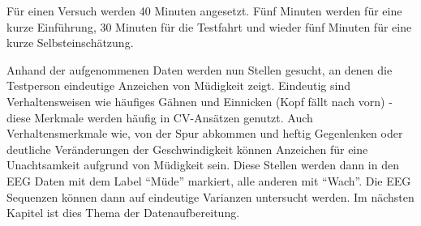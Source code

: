 Für einen Versuch werden 40 Minuten angesetzt. Fünf Minuten werden für eine kurze Einführung, 30 Minuten für die Testfahrt und wieder fünf Minuten für eine kurze Selbsteinschätzung.

Anhand der aufgenommenen Daten werden nun Stellen gesucht, an denen die Testperson eindeutige Anzeichen von Müdigkeit zeigt. Eindeutig sind Verhaltensweisen wie häufiges Gähnen und Einnicken (Kopf fällt nach vorn) - diese Merkmale werden häufig in CV-Ansätzen genutzt. 
Auch Verhaltensmerkmale wie, von der Spur abkommen und heftig Gegenlenken oder deutliche Veränderungen der Geschwindigkeit können Anzeichen für eine Unachtsamkeit aufgrund von Müdigkeit sein.
Diese Stellen werden dann in den EEG Daten mit dem Label "`Müde"' markiert, alle anderen mit "`Wach"'. Die EEG Sequenzen können dann auf eindeutige Varianzen untersucht werden. Im nächsten Kapitel ist dies Thema der Datenaufbereitung.